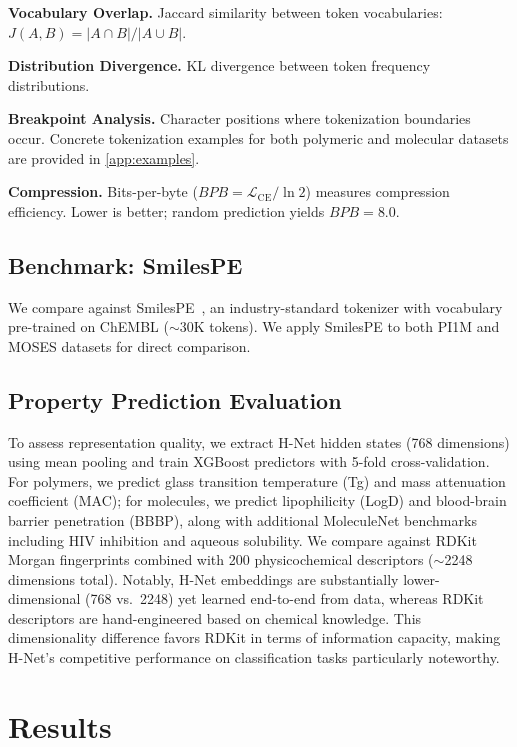 \documentclass{article}
\newcommand{\hnet}{H-Net}
\newcommand{\smilespe}{SmilesPE}
\newcommand{\bpb}{BPB}
\begin{document}
\textbf{Vocabulary Overlap.} Jaccard similarity between token vocabularies: $J(A,B) = |A \cap B| / |A \cup B|$.

\textbf{Distribution Divergence.} KL divergence between token frequency distributions.

\textbf{Breakpoint Analysis.} Character positions where tokenization boundaries occur. Concrete tokenization examples for both polymeric and molecular datasets are provided in \cref{app:examples}.

\textbf{Compression.} Bits-per-byte ($\bpb{} = \mathcal{L}_{\text{CE}} / \ln 2$) measures compression efficiency. Lower is better; random prediction yields $\bpb{} = 8.0$.

\subsection{Benchmark: SmilesPE}

We compare against \smilespe{}~\citep{li2020smilespe}, an industry-standard tokenizer with vocabulary pre-trained on ChEMBL ($\sim$30K tokens). We apply \smilespe{} to both PI1M and MOSES datasets for direct comparison.

\subsection{Property Prediction Evaluation}

To assess representation quality, we extract \hnet{} hidden states (768 dimensions) using mean pooling and train XGBoost predictors with 5-fold cross-validation. For polymers, we predict glass transition temperature (Tg) and mass attenuation coefficient (MAC); for molecules, we predict lipophilicity (LogD) and blood-brain barrier penetration (BBBP), along with additional MoleculeNet benchmarks including HIV inhibition and aqueous solubility. We compare against RDKit Morgan fingerprints combined with 200 physicochemical descriptors ($\sim$2248 dimensions total). Notably, \hnet{} embeddings are substantially lower-dimensional (768 vs.\ 2248) yet learned end-to-end from data, whereas RDKit descriptors are hand-engineered based on chemical knowledge. This dimensionality difference favors RDKit in terms of information capacity, making \hnet{}'s competitive performance on classification tasks particularly noteworthy.

\section{Results}
\label{sec:results}
\end{document}
